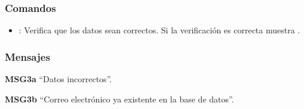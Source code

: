 \subsubsection{Comandos}
\begin{itemize}
	\item {}:  Verifica que los datos sean correctos. Si la verificación es correcta muestra .	
\end{itemize}

\subsubsection{Mensajes}
	\begin{Citemize}
		\item {\bf MSG3a} “Datos incorrectos”.
        \item {\bf MSG3b}  “Correo electrónico ya existente en la base de datos”.
	\end{Citemize}
    
    
    